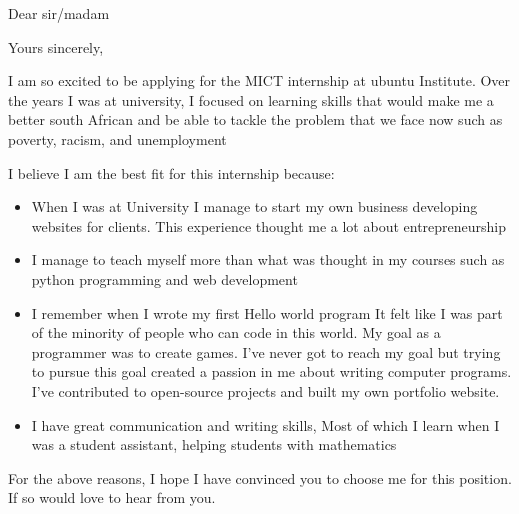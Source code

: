 \documentclass[11pt,a4paper,roman]{moderncv}        %
\begin{document}
\date{\today}
\opening{Dear sir/madam}
\closing{Yours sincerely,}

\makelettertitle

I am so excited to be applying for the MICT internship at ubuntu Institute.
Over the years I was at university, I focused on learning skills that would
make me a better south African and be able to tackle the problem that we face
now such as poverty, racism, and unemployment


I believe I am the best fit for this internship because:
\begin{itemize} \itemsep1em 
	\item When I was at University I manage to start my own business developing websites for clients. This experience thought me a lot about entrepreneurship
  
	\item I manage to teach myself more than what was thought in my courses such as python programming and web development

	\item I remember when I wrote my first Hello world program It felt like I was part of the minority of people who can code in this world. My goal as a programmer was to create games. I've never got to reach my goal but trying to pursue this goal created a passion in me about writing computer programs. I've contributed to open-source projects and built my own portfolio website.

	\item I have great communication and writing skills, Most of which I learn when I was a student assistant, helping students with mathematics
\end{itemize}

For the above reasons, I hope I have convinced you to choose me for this position. If so would love to hear from you.


\vspace{0.5cm}


\makeletterclosing
\end{document}
